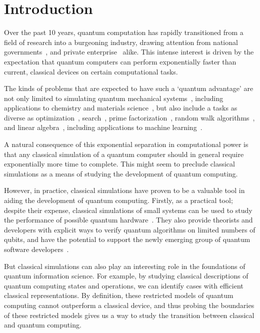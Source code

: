 
\chapter{Introduction}\label{chap:introduction}
Over the past 10 years, quantum computation has rapidly transitioned from a field of research into a burgeoning industry, drawing attention from national governments~\cite{UKNQTP,QuantumFlagship}, and private enterprise~\cite{IBMQ,GoogleQuantum,MicrosoftQuantum} alike. This intense interest is driven by the expectation that quantum computers can perform exponentially faster than current, classical devices on certain computational tasks.\par
The kinds of problems that are expected to have such a `quantum advantage' are not only limited to simulating quantum mechanical systems~\cite{Lloyd1996}, including applications to chemistry and materials science~\cite{Brown2010}, but also include a tasks as diverse as optimization~\cite{Moll2018}, search~\cite{Grover1996}, prime factorization~\cite{Shor1994}, random walk algorithms~\cite{Kendon2006}, and linear algebra~\cite{Harrow2009}, including applications to machine learning~\cite{Biamonte2017}.\par
A natural consequence of this exponential separation in computational power is that any classical simulation of a quantum computer should in general require exponentially more time to complete. This might seem to preclude classical simulations as a means of studying the development of quantum computing.\par
However, in practice, classical simulations have proven to be a valuable tool in aiding the development of quantum computing. Firstly, as a practical tool; despite their expense, classical simulations of small systems can be used to study the performance of possible quantum hardware~\cite{Cai2019}. They also provide theorists and developers with explicit ways to verify quantum algorithms on limited numbers of qubits, and have the potential to support the newly emerging group of quantum software developers~\cite{Qiskit,MicrosoftQDK,CircAnnouncement}.\par
But classical simulations can also play an interesting role in the foundations of quantum information science. For example, by studying classical descriptions of quantum computing states and operations, we can identify cases with efficient classical representations. By definition, these restricted models of quantum computing cannot outperform a classical device, and thus probing the boundaries of these restricted models gives us a way to study the transition between classical and quantum computing.\par
